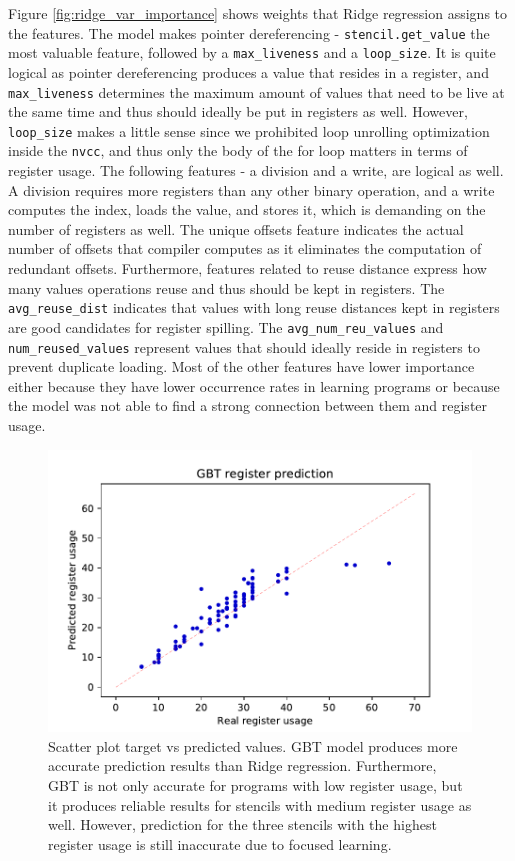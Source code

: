 \documentclass[sigplan,\review anonymous]{acmart}
\begin{document}
Figure \ref{fig:ridge_var_importance} shows weights that Ridge regression
assigns to the features. The model makes pointer dereferencing - 
\texttt{stencil.get\_value} the most valuable feature, followed by a
\texttt{max\_liveness} and a \texttt{loop\_size}. It is quite logical as
pointer dereferencing produces a value that resides in a register, and
\texttt{max\_liveness} determines the maximum amount of values that need to
be live at the same time and thus should ideally be put in registers as well.
However, \texttt{loop\_size} makes a little sense since we prohibited loop
unrolling optimization inside the \texttt{nvcc}, and thus only the body of the
for loop matters in terms of register usage. The following features - a
division and a write, are logical as well. A division requires more registers
than any other binary operation, and a write computes the index, loads the
value, and stores it, which is demanding on the number of registers as well.
The unique offsets feature indicates the actual number of offsets that compiler
computes as it eliminates the computation of redundant offsets. Furthermore,
features related to reuse distance express how many values operations reuse
and thus should be kept in registers. The \texttt{avg\_reuse\_dist} indicates
that values with long reuse distances kept in registers are good candidates
for register spilling. The \texttt{avg\_num\_reu\_values} and
\texttt{num\_reused\_values} represent values that should ideally reside in
registers to prevent duplicate loading. Most of the other features have lower
importance either because they have lower occurrence rates in learning
programs or because the model was not able to find a strong connection between
them and register usage.

\begin{figure}
  \centering
  \includegraphics[width=\columnwidth]{images/gbt_pred.pdf}
  \caption{Scatter plot target vs predicted values. GBT model produces
  more accurate prediction results than Ridge regression. Furthermore,
  GBT is not only accurate for programs with low register usage, but it
  produces reliable results for stencils with medium register usage as well.
  However, prediction for the three stencils with the highest register usage
  is still inaccurate due to focused learning.}
  \label{fig:gbt_pred}
\end{figure}
\end{document}
